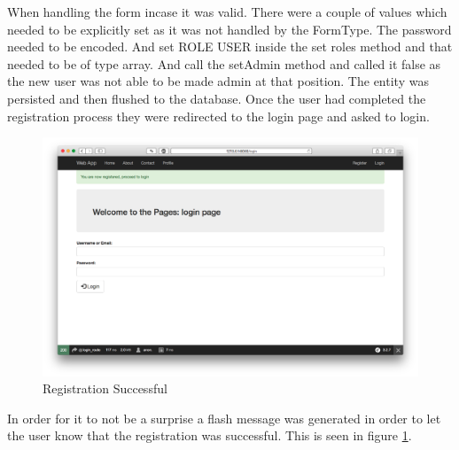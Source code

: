 When handling the form incase it was valid. There were a couple of values which needed to be explicitly set as it was not handled by the FormType. The password needed to be encoded. And set ROLE USER inside the set roles method and that needed to be of type array. And call the setAdmin method and called it false as the new user was not able to be made admin at that position. The entity was persisted and then flushed to the database. Once the user had completed the registration process they were redirected to the login page and asked to login.

\begin{figure}[htbp]
   \centering
   \includegraphics[width=400pt]{figures/register_successful.png} %
   \caption{Registration Successful}
   \label{fig:Registration Successful}
\end{figure}

In order for it to not be a surprise a flash message was generated in order to let the user know that the registration was successful. This is seen in figure \ref{fig:Registration Successful}.














